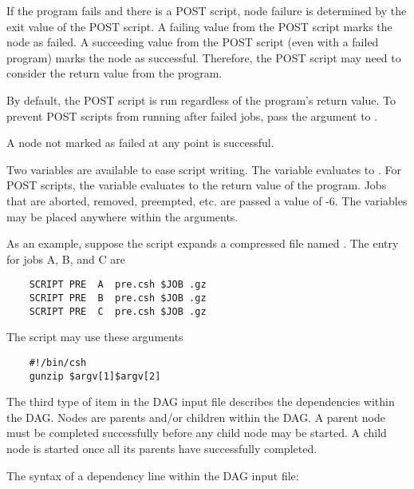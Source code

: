 If the program fails and there is a POST script,
node failure is determined by the exit value of the POST script.
A failing value from the POST script marks the node as failed.
A succeeding value from the POST script (even with a failed
program) marks the node as successful.
Therefore, the POST script may need to consider the return
value from the program.

By default, the POST script is run regardless of the program's
return value.  To prevent POST scripts from running after failed jobs,
pass the  argument to .

A node not marked as failed at any point is successful.

Two variables are available to ease script writing.
The  variable evaluates to .
For POST scripts, the  variable evaluates to the return value of the program.
Jobs that are aborted, removed, preempted, etc. are passed a 
value of -6.
The variables may be
placed anywhere within the arguments.

As an example, suppose the  script expands a compressed file named
.
The  entry for jobs A, B, and C are

\begin{verbatim}
	SCRIPT PRE  A  pre.csh $JOB .gz
	SCRIPT PRE  B  pre.csh $JOB .gz
	SCRIPT PRE  C  pre.csh $JOB .gz
\end{verbatim}

The script  may use these arguments

\begin{verbatim}
	#!/bin/csh
	gunzip $argv[1]$argv[2]
\end{verbatim}


The third type of item in the DAG input file describes the
dependencies within the DAG.
Nodes are parents and/or children within the DAG.
A parent node must be completed successfully before
any child node may be started.
A child node is started once
all its parents have successfully completed.

The syntax of a dependency line within the DAG input file:

   

